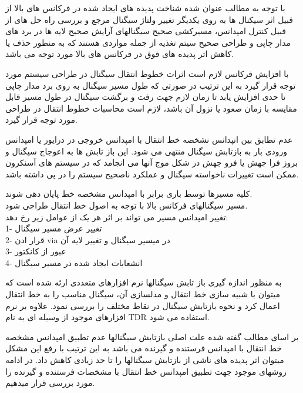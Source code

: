 با توجه به مطالب عنوان شده شناخت پدیده های ایجاد شده در فرکانس های بالا از قبیل اثر سیکنال ها به روی یکدیگر تغییر ولتاژ سیگنال مرجع و بررسی راه حل های از قبیل کنترل امپدانس، مسیرکشی صحیح سیگنالهای آرایش صحیح لایه ها در برد های مدار چاپی و طراحی صحیح سیتم تغذیه از جمله مواردی هستند که به منظور حذف یا کاهش اثر پدیده های فوق در فرکانس های بالا مورد توجه می باشد.


با افزایش فرکانس لازم است اثرات خطوط انتقال سیگنال در طراحی سیستم مورد توجه قرار گیرد به این ترتیب در صورتی که طول مسیر سیگنال به روی برد مدار چاپی تا حدی افزایش یابد تا زمان لازم جهت رفت و برگشت سیگنال در طول مسیر قابل مقایسه با زمان صعود یا نزول آن باشد، لازم است محاسبات خطوط انتقال در طراحی مورد توجه قرار گیرد.

عدم تطابق بین انپدانس نشخصه خط انتقال با امپدانس خروجی در درایور یا امپدانس ورودی بار به بازتابش سیگنال منتهی می شود. این باز تابش ها به اعوجاج سیگنال و بروز فرا جهش یا فرو جهش در شکل موج آنها می انجامد که در سیستم های آسنکرون ممکن است تغییرات ناخواسته سیگنال و عملکرد ناصحیح سیستم را در پی داشته باشد.

 
کلیه مسیرها توسط باری برابر با امپدانس مشخصه خط پایان دهی شوند.\\
مسیر سیگنالهای فرکانس بالا با توجه به اصول خط انتقال طراحی شود.\\
تغییر امپدانس مسیر می تواند بر اثر هر یک از عوامل زیر رخ دهد:\\
1- تغییر عرض مسیر سیگنال\\
2- قرار ادن via در میسیر سیگنال و تغییر لایه آن \\
3- عبور از کانکتور \\
4- انشعابات ایجاد شده در مسیر سیگنال\\


به منظور اندازه گیری باز تابش سیگنالها نرم افزارهای متعددی ارئه شده است که میتوان با شبیه سازی خط انتقال و مدلسازی آن، سیگنال مناسب را به خط انتقال اعمال کرد و نحوه بازتابش سیگنال در نقاط مختلف را بررسی نمود. علاوه بر نرم افزارهای موجود از وسیله ای به نام TDR استفاده می شود.

بر اسای مطالب گفته شده علت اصلی بازتابش سیگنالها عدم تطبیق امپدانس مشخصه خط انتقال با امپدانس فرستنده و گیرنده می باشد به این ترتیب با رفع این مشکل میتوان اثر پدیده های ناشی از بازتابش سیگنالها را تا حد زیادی کاهش داد. در ادامه روشهای موجود جهت تطبیق امپدانس خط انتقال با مشخصات فرستنده و گیرنده را مورد بررسی قرار میدهیم.

